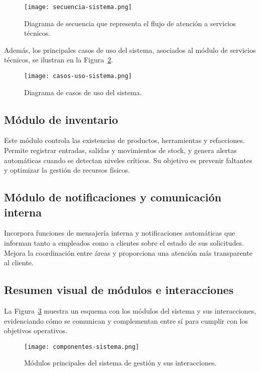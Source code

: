 	\begin{figure}[H]
		\centering
		\texttt{[image: secuencia-sistema.png]}
		\caption{Diagrama de secuencia que representa el flujo de atención a servicios técnicos.}
		\label{fig:secuencia}
	\end{figure}
	
	Además, los principales casos de uso del sistema, asociados al módulo de servicios técnicos, se ilustran en la Figura~\ref{fig:casosuso}.
	
	\begin{figure}[H]
		\centering
		\texttt{[image: casos-uso-sistema.png]}
		\caption{Diagrama de casos de uso del sistema.}
		\label{fig:casosuso}
	\end{figure}
	
	\subsection*{Módulo de inventario}
	
	Este módulo controla las existencias de productos, herramientas y refacciones. Permite registrar entradas, salidas y movimientos de stock, y genera alertas automáticas cuando se detectan niveles críticos. Su objetivo es prevenir faltantes y optimizar la gestión de recursos físicos.
	
	\subsection*{Módulo de notificaciones y comunicación interna}
	
	Incorpora funciones de mensajería interna y notificaciones automáticas que informan tanto a empleados como a clientes sobre el estado de sus solicitudes. Mejora la coordinación entre áreas y proporciona una atención más transparente al cliente.
	
	\subsection*{Resumen visual de módulos e interacciones}
	
	La Figura~\ref{fig:modulos} muestra un esquema con los módulos del sistema y sus interacciones, evidenciando cómo se comunican y complementan entre sí para cumplir con los objetivos operativos.
	
	\begin{figure}[H]
		\centering
		\texttt{[image: componentes-sistema.png]}
		\caption{Módulos principales del sistema de gestión y sus interacciones.}
		\label{fig:modulos}
	\end{figure}
	
